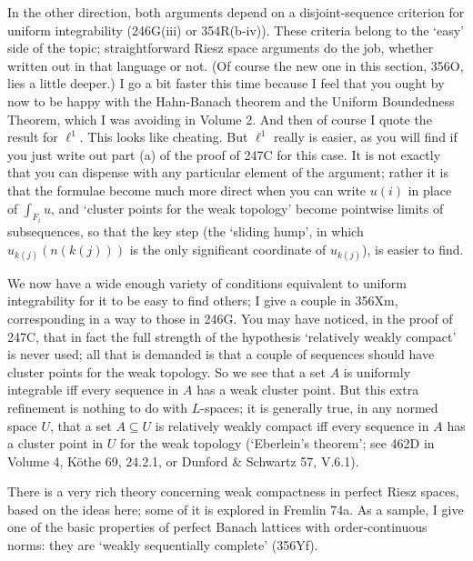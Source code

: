 {In the other direction, both arguments depend on a disjoint-sequence
criterion for uniform integrability (246G(iii) or 354R(b-iv)).   These
criteria belong to the `easy' side of the topic;  straightforward
Riesz space arguments do the job, whether written out in that language
or not.   (Of course the new one in this section, 356O, lies a little
deeper.)   I go a bit faster this time because I feel that you ought by
now to be happy with the Hahn-Banach theorem and the Uniform Boundedness
Theorem, which I was avoiding in Volume 2.   And then of course I quote
the result for $\ell^1$.   This looks like cheating.   But $\ell^1$
really is easier, as you will find if you just write out part (a) of the
proof of 247C for this case.   It is not exactly that you can dispense
with any particular element of the argument;  rather it is that the
formulae become much more direct when you can write $u(i)$ in place of
$\int_{F_i}u$, and `cluster points for the weak topology' become
pointwise limits of subsequences, so that the key step (the `sliding
hump', in which $u_{k(j)}(n(k(j)))$ is the only significant coordinate
of $u_{k(j)}$), is easier to find.

We now have a wide enough variety of conditions equivalent to uniform
integrability for it to be easy to find others;  I give a couple in
356Xm, corresponding in a way to those in 246G.   You may have noticed,
in the proof of 247C, that in fact the full strength of the hypothesis
`relatively weakly compact' is never used;  all that is demanded is
that a couple of sequences should have cluster points for the weak
topology.   So we see that a set $A$ is uniformly integrable iff every
sequence in $A$ has a weak cluster point.   But this extra refinement is
nothing to do with $L$-spaces;  it is generally true, in any normed
space $U$, that a set $A\subseteq U$ is relatively weakly compact iff
every sequence in $A$ has a cluster point in $U$ for the weak topology
(`Eberlein's theorem';  see 462D in Volume 4, {\smc K\"othe 69}, 24.2.1,
or {\smc Dunford \& Schwartz 57}, V.6.1).

There is a very rich theory concerning weak compactness in perfect Riesz
spaces, based on the ideas here;  some of it is explored in {\smc
Fremlin 74a}.   As a sample, I give one of the basic properties of
perfect Banach lattices with order-continuous norms:  they are `weakly
sequentially complete' (356Yf).
}%

\frnewpage

